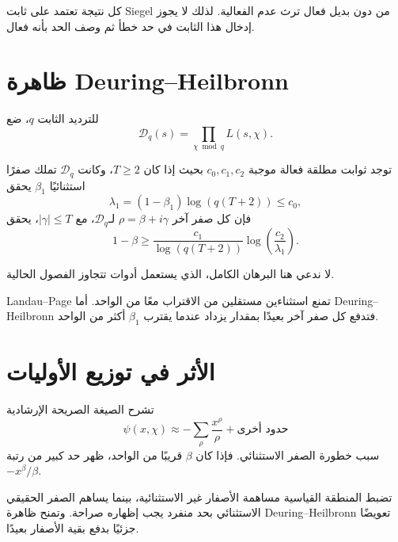 \begin{remark}
كل نتيجة تعتمد على ثابت Siegel من دون بديل فعال ترث عدم الفعالية. لذلك لا
يجوز إدخال هذا الثابت في حد خطأ ثم وصف الحد بأنه فعال.
\end{remark}

\section{ظاهرة Deuring--Heilbronn}

للترديد الثابت \(q\)، ضع
\[
\mathcal D_q(s)=\prod_{\chi\bmod q}L(s,\chi).
\]

\begin{theorem}
\label{thm:chapter11-deuring-heilbronn}
توجد ثوابت مطلقة فعالة موجبة \(c_0,c_1,c_2\) بحيث إذا كان \(T\ge2\)،
وكانت \(\mathcal D_q\) تملك صفرًا استثنائيًا \(\beta_1\) يحقق
\[
\lambda_1=(1-\beta_1)\log(q(T+2))\le c_0,
\]
فإن كل صفر آخر \(\rho=\beta+i\gamma\) لـ\(\mathcal D_q\)، مع
\(|\gamma|\le T\)، يحقق
\[
1-\beta\ge
\frac{c_1}{\log(q(T+2))}
\log\!\left(\frac{c_2}{\lambda_1}\right).
\tag{11.7}
\]
\end{theorem}

\noindent لا ندعي هنا البرهان الكامل، الذي يستعمل أدوات تتجاوز الفصول
الحالية.

\begin{remark}
Landau--Page تمنع استثناءين مستقلين من الاقتراب معًا من الواحد. أما
Deuring--Heilbronn فتدفع كل صفر آخر بعيدًا بمقدار يزداد عندما يقترب
\(\beta_1\) أكثر من الواحد.
\end{remark}

\section{الأثر في توزيع الأوليات}

تشرح الصيغة الصريحة الإرشادية
\[
\psi(x,\chi)\approx-
\sum_\rho\frac{x^\rho}{\rho}+\text{حدود أخرى}
\]
سبب خطورة الصفر الاستثنائي. فإذا كان \(\beta\) قريبًا من الواحد، ظهر حد
كبير من رتبة \(-x^\beta/\beta\).

\begin{proposition}
\label{prop:chapter11-explicit-formula-diagnostic}
تضبط المنطقة القياسية مساهمة الأصفار غير الاستثنائية، بينما يساهم الصفر
الحقيقي الاستثنائي بحد منفرد يجب إظهاره صراحة. وتمنح ظاهرة
Deuring--Heilbronn تعويضًا جزئيًا بدفع بقية الأصفار بعيدًا.
\end{proposition}

